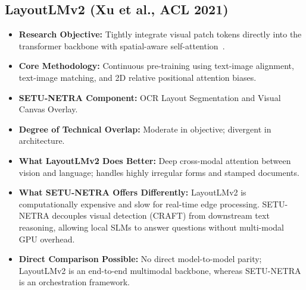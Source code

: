 \documentclass[11pt,a4paper]{article}
\begin{document}
\subsection{LayoutLMv2 (Xu et al., ACL 2021)}
\begin{itemize}[leftmargin=*]
    \item \textbf{Research Objective:} Tightly integrate visual patch tokens directly into the transformer backbone with spatial-aware self-attention~\cite{Xu2021LayoutLMv2}.
    \item \textbf{Core Methodology:} Continuous pre-training using text-image alignment, text-image matching, and 2D relative positional attention biases.
    \item \textbf{SETU-NETRA Component:} OCR Layout Segmentation and Visual Canvas Overlay.
    \item \textbf{Degree of Technical Overlap:} Moderate in objective; divergent in architecture.
    \item \textbf{What LayoutLMv2 Does Better:} Deep cross-modal attention between vision and language; handles highly irregular forms and stamped documents.
    \item \textbf{What SETU-NETRA Offers Differently:} LayoutLMv2 is computationally expensive and slow for real-time edge processing. SETU-NETRA decouples visual detection (CRAFT) from downstream text reasoning, allowing local SLMs to answer questions without multi-modal GPU overhead.
    \item \textbf{Direct Comparison Possible:} No direct model-to-model parity; LayoutLMv2 is an end-to-end multimodal backbone, whereas SETU-NETRA is an orchestration framework.
\end{itemize}

\end{document}
